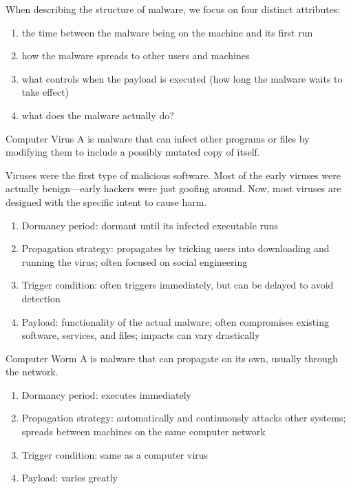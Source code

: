 \documentclass[code]{amznotes}
\begin{document}
When describing the structure of malware, we focus on four distinct attributes:
\begin{enumerate}[noitemsep]
    \item {} the time between the malware being on the machine and its first run
    \item {} how the malware spreads to other users and machines
    \item {} what controls when the payload is executed (how long the malware waits to take effect)
    \item {} what does the malware actually do?
\end{enumerate}

\begin{dfnbox}{Computer Virus}{}
    A  is malware that can infect other programs or files by modifying them to include a possibly mutated copy of itself.
\end{dfnbox}

Viruses were the first type of malicious software. Most of the early viruses were actually benign---early hackers were just goofing around. Now, most viruses are designed with the specific intent to cause harm.

\begin{enumerate}[noitemsep]
    \item Dormancy period: dormant until its infected executable runs
    \item Propagation strategy: propagates by tricking users into downloading and running the virus; often focused on social engineering
    \item Trigger condition: often triggers immediately, but can be delayed to avoid detection
    \item Payload: functionality of the actual malware; often compromises existing software, services, and files; impacts can vary drastically
\end{enumerate}

\begin{dfnbox}{Computer Worm}{}
    A  is malware that can propagate on its own, usually through the network.
\end{dfnbox}

\begin{enumerate}
    \item Dormancy period: executes immediately
    \item Propagation strategy: automatically and continuously attacks other systems; spreads between machines on the same computer network
    \item Trigger condition: same as a computer virus
    \item Payload: varies greatly
\end{enumerate}
\end{document}
